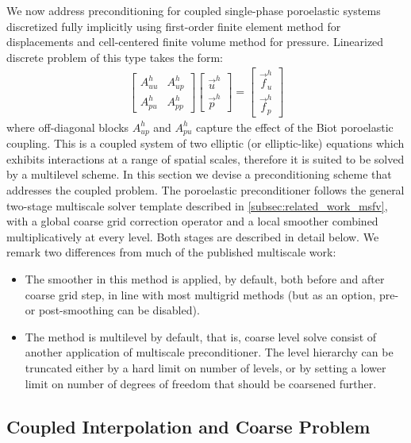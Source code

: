 We now address preconditioning for coupled single-phase poroelastic systems discretized fully implicitly using first-order finite element method for displacements and cell-centered finite volume method for pressure.   Linearized discrete problem of this type takes the form:
\begin{align}
    \begin{bmatrix}
        A_{uu}^h & A_{up}^h \\
        A_{pu}^h & A_{pp}^h
    \end{bmatrix}
    \begin{bmatrix}
        \vec{u}^h \\
        \vec{p}^h
    \end{bmatrix} =
    \begin{bmatrix}
        \vec{f}_u^h \\
        \vec{f}_p^h
    \end{bmatrix}
    \label{eq:coupled_poroelastic_linear_system}
\end{align}
where off-diagonal blocks $A_{up}^h$ and $A_{pu}^h$ capture the effect of the Biot poroelastic coupling.   This is a coupled system of two elliptic (or elliptic-like) equations which exhibits interactions at a range of spatial scales, therefore it is suited to be solved by a multilevel scheme.   In this section we devise a preconditioning scheme that addresses the coupled problem.   The poroelastic preconditioner follows the general two-stage multiscale solver template described in \autoref{subsec:related_work_msfv}, with a global coarse grid correction operator and a local smoother combined multiplicatively at every level.   Both stages are described in detail below.    We remark two differences from much of the published multiscale work:
\begin{itemize}
    \item The smoother in this method is applied, by default, both before and after coarse grid step, in line with most multigrid methods (but as an option, pre- or post-smoothing can be disabled).
    \item The method is multilevel by default, that is, coarse level solve consist of another application of multiscale preconditioner.   The level hierarchy can be truncated either by a hard limit on number of levels, or by setting a lower limit on number of degrees of freedom that should be coarsened further.
\end{itemize}

\subsection{Coupled Interpolation and Coarse Problem}
\label{subsec:coupled_interpolation}

